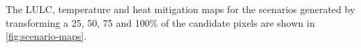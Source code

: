 \documentclass[10pt,letterpaper]{article}
\begin{document}
The LULC, temperature and heat mitigation maps for the scenarios generated by transforming a 25, 50, 75 and 100\% of the candidate pixels are shown in \autoref{fig:scenario-maps}.
\end{document}
